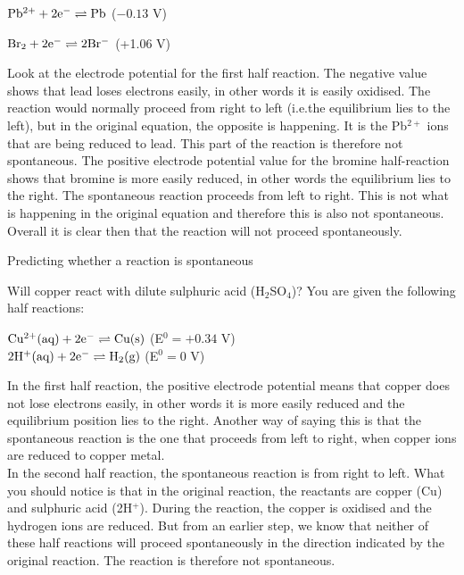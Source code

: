 \begin{center}
$\rm{Pb^{2+} + 2e^{-} \rightleftharpoons Pb}$ ($-0.13$ V)

$\rm{Br_{2} + 2e^{-} \rightleftharpoons 2Br^{-}}$ (+1.06 V)
\end{center}

Look at the electrode potential for the first half reaction. The negative value shows that lead loses electrons easily, in other words it is easily oxidised. The reaction would normally proceed from right to left (i.e.\@ the equilibrium lies to the left), but in the original equation, the opposite is happening. It is the Pb$^{2+}$ ions that are being reduced to lead. This part of the reaction is therefore not spontaneous. The positive electrode potential value for the bromine half-reaction shows that bromine is more easily reduced, in other words the equilibrium lies to the right. The spontaneous reaction proceeds from left to right. This is not what is happening in the original equation and therefore this is also not spontaneous. Overall it is clear then that the reaction will not proceed spontaneously.

\begin{wex}{Predicting whether a reaction is spontaneous}{Will copper react with dilute sulphuric acid (H$_{2}$SO$_{4}$)? You are given the following half reactions:
\begin{center}
$\rm{Cu^{2+}(aq) + 2e^{-} \rightleftharpoons Cu(s)}$ (E$^{0} = +0.34$ V)\\
$\rm{2H^{+}(aq) + 2e^{-} \rightleftharpoons H_{2}(g)}$ (E$^{0} = 0$ V)
\end{center} 
}{
In the first half reaction, the positive electrode potential means that copper does not lose electrons easily, in other words it is more easily reduced and the equilibrium position lies to the right. Another way of saying this is that the spontaneous reaction is the one that proceeds from left to right, when copper ions are reduced to copper metal.\\
In the second half reaction, the spontaneous reaction is from right to left.
What you should notice is that in the original reaction, the reactants are copper (Cu) and sulphuric acid (2H$^{+}$). During the reaction, the copper is oxidised and the hydrogen ions are reduced. But from an earlier step, we know that neither of these half reactions will proceed spontaneously in the direction indicated by the original reaction. The reaction is therefore not spontaneous.
}
\end{wex} 

